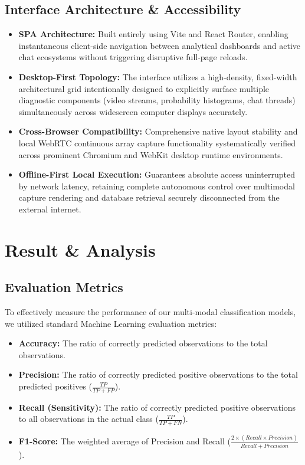 \documentclass[11pt]{report}
\begin{document}
\section{Interface Architecture \& Accessibility}
\begin{itemize}
    \item \textbf{SPA Architecture:} Built entirely using Vite and React Router, enabling instantaneous client-side navigation between analytical dashboards and active chat ecosystems without triggering disruptive full-page reloads.
    \item \textbf{Desktop-First Topology:} The interface utilizes a high-density, fixed-width architectural grid intentionally designed to explicitly surface multiple diagnostic components (video streams, probability histograms, chat threads) simultaneously across widescreen computer displays accurately.
    \item \textbf{Cross-Browser Compatibility:} Comprehensive native layout stability and local WebRTC continuous array capture functionality systematically verified across prominent Chromium and WebKit desktop runtime environments.
    \item \textbf{Offline-First Local Execution:} Guarantees absolute access uninterrupted by network latency, retaining complete autonomous control over multimodal capture rendering and database retrieval securely disconnected from the external internet.
\end{itemize}

\chapter{Result \& Analysis}

\section{Evaluation Metrics}
To effectively measure the performance of our multi-modal classification models, we utilized standard Machine Learning evaluation metrics:
\begin{itemize}
    \item \textbf{Accuracy:} The ratio of correctly predicted observations to the total observations.
    \item \textbf{Precision:} The ratio of correctly predicted positive observations to the total predicted positives ($\frac{TP}{TP + FP}$).
    \item \textbf{Recall (Sensitivity):} The ratio of correctly predicted positive observations to all observations in the actual class ($\frac{TP}{TP + FN}$).
    \item \textbf{F1-Score:} The weighted average of Precision and Recall ($\frac{2 \times (Recall \times Precision)}{Recall + Precision}$).
\end{itemize}
\end{document}
